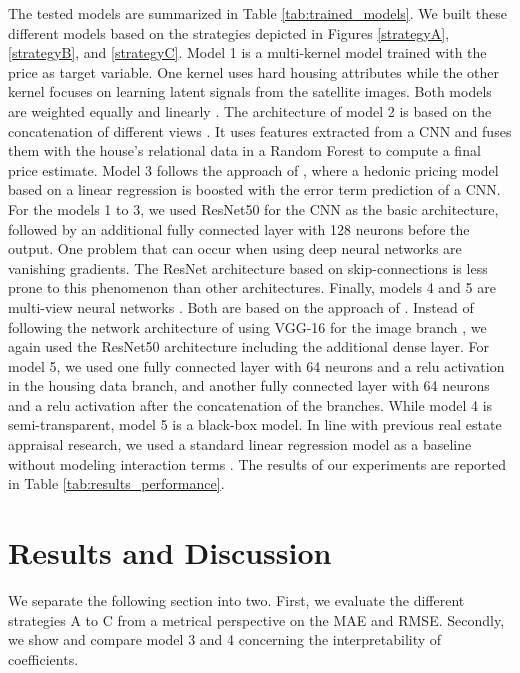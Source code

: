 \documentclass[letterpaper]{article}
\begin{document}
The tested models are summarized in Table \ref{tab:trained_models}. We built these different models based on the strategies depicted in Figures \ref{strategyA}, \ref{strategyB}, and \ref{strategyC}. Model 1 is a multi-kernel model trained with the price as target variable. One kernel uses hard housing attributes while the other kernel focuses on learning latent signals from the satellite images. Both models are weighted equally and linearly \cite{xu2013survey}. The architecture of model 2 is based on the concatenation of different views \cite{poursaeed2018vision, bency2017beyond, bessinger2016quantifying}. It uses features extracted from a CNN and fuses them with the house's relational data in a Random Forest to compute a final price estimate. Model 3 follows the approach of \citeauthor{naumzik2020one} \citeyearpar{naumzik2020one}, where a hedonic pricing model based on a linear regression is boosted with the error term prediction of a CNN. For the models 1 to 3, we used ResNet50 \cite{he2015delving} for the CNN as the basic architecture, followed by an additional fully connected layer with 128 neurons before the output. One problem that can occur when using deep neural networks are vanishing gradients. The ResNet architecture based on skip-connections is less prone to this phenomenon than other architectures. Finally, models 4 and 5 are multi-view neural networks \cite{li2018survey}. Both are based on the approach of \citeauthor{law2019take} \citeyearpar{law2019take}. Instead of following the network architecture of \citeauthor{law2019take}  \citeyearpar{law2019take} using VGG-16 for the image branch \cite{simonyan2014very},  we again used the ResNet50 architecture including the additional dense layer. For model 5, we used one fully connected layer with 64 neurons and a relu activation in the housing data branch, and another fully connected layer with 64 neurons and a relu activation after the concatenation of the branches. While model 4 is semi-transparent, model 5 is a black-box model. In line with previous real estate appraisal research, we used a standard linear regression model as a baseline without modeling interaction terms  \cite{limsombunchai2004house}. The results of our experiments are reported in Table \ref{tab:results_performance}.

\section{Results and Discussion}
We separate the following section into two. First, we evaluate the different strategies A to C from a metrical perspective on the MAE and RMSE. Secondly, we show and compare model 3 and 4 concerning the interpretability of coefficients.
\end{document}
